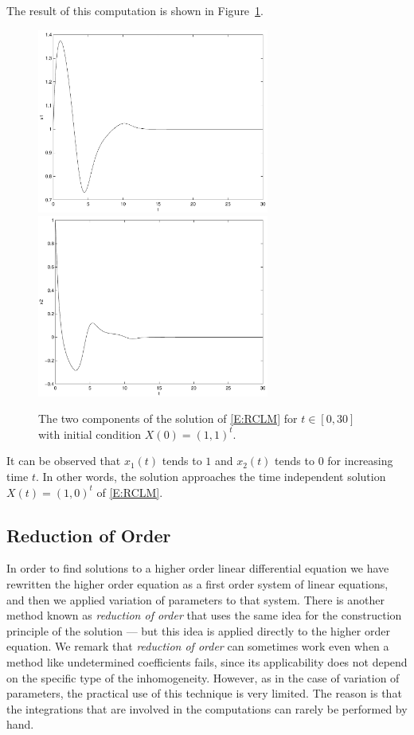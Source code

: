 \documentclass{ximera}
\begin{document}
The result of this computation is shown in Figure~\ref{Fig:micro1}.
\begin{figure}[htb]
 \centerline{%
           \includegraphics[width=3.0in]{../figures/microx1.pdf}
	   \includegraphics[width=3.0in]{../figures/microx2.pdf}}
           \caption{The two components of the solution of 
	   \protect\eqref{E:RCLM} for $t\in[0,30]$ with initial
	   condition $X(0)=(1,1)^t$.}
           \label{Fig:micro1}
\end{figure}
It can be observed that $x_1(t)$ tends to $1$ and $x_2(t)$ tends to
$0$ for increasing time $t$.  In other words, the solution approaches the 
time independent solution $X(t)=(1,0)^t$ of \eqref{E:RCLM}.

\subsection*{Reduction of Order}

In order to find solutions to a higher order linear differential equation 
we have rewritten the higher order equation as a first order
system of linear equations, and then we applied variation of
parameters to that system.  There is another method known as
{\em reduction of order\/} that uses the same idea for the
construction principle of the solution --- but this idea is applied directly 
to the higher order equation.  We remark that {\em reduction of
order\/} can sometimes work even when a method like undetermined 
coefficients fails, since its applicability does not depend on the 
specific type of the inhomogeneity.  However, as in the case 
of variation of parameters, the practical use of this technique is very 
limited.  The reason is that the integrations that are involved in the 
computations can rarely be performed by hand.
\end{document}
